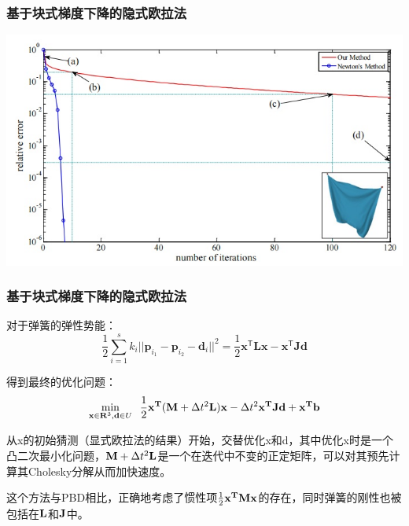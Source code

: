\documentclass[aspectratio=43]{ctexbeamer}
\begin{document}
\begin{frame}
  \frametitle{基于块式梯度下降的隐式欧拉法}
        \begin{center}
            \includegraphics[width=1.0\linewidth]{./fig/块式梯度下降与牛顿法.jpg}
        \end{center}
\end{frame}

\begin{frame}
  \frametitle{基于块式梯度下降的隐式欧拉法}
		\; \;对于弹簧的弹性势能：
       \begin{equation}
			\frac{1}{2}\sum_{i=1}^{s}k_{i}||\mathbf{p}_{i_{1}}-\mathbf{p}_{i_{2}}-\mathbf{d}_{i}||^{2}={\frac{1}{2}}\mathbf{x}^{\mathsf{T}}\mathbf{L}\mathbf{x}-\mathbf{x}^{\mathsf{T}}\mathbf{J}\mathbf{d}
		\end{equation}

		\; \;得到最终的优化问题：
       \begin{equation}
			\operatorname*{min}_{{{\bf x}\in{\bf R}^{3},{\bf d}\in U}}\;\;\frac{1}{2}{\bf x}^{\bf T}({\bf M}+\Delta t^2{\bf L}){\bf x}-\Delta t^2{\bf x}^{\bf T}{\bf J}{\bf d}+{\bf x}^{\bf T}{\bf b}
		\end{equation}

		\; \;从x的初始猜测（显式欧拉法的结果）开始，交替优化x和d，其中优化x时是一个凸二次最小化问题，${\bf M}+\Delta t^2{\bf L}$是一个在迭代中不变的正定矩阵，可以对其预先计算其Cholesky分解从而加快速度。

		\; \;这个方法与PBD相比，正确地考虑了惯性项$\frac{1}{2}{\bf x}^{\bf T}{\bf M}{\bf x}$的存在，同时弹簧的刚性也被包括在${\bf L}$和${\bf J}$中。
\end{frame}
\end{document}
